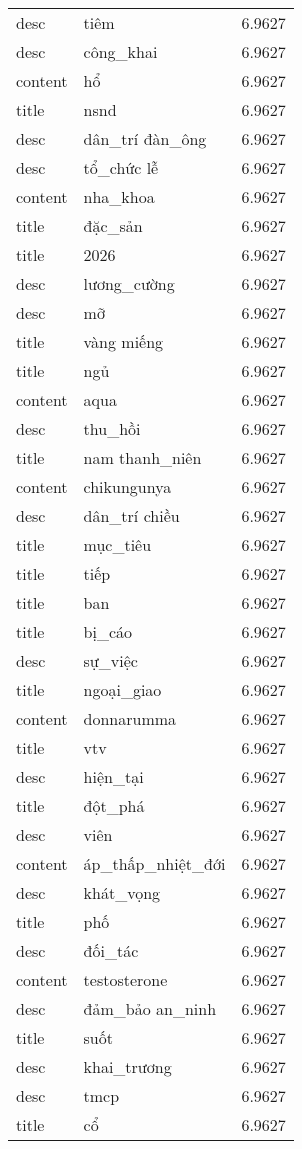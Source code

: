 \documentclass{article}
\begin{document}
\begin{tabular}{lll}
desc & tiêm & 6.9627\\
desc & công\_khai & 6.9627\\
content & hổ & 6.9627\\
title & nsnd & 6.9627\\
desc & dân\_trí đàn\_ông & 6.9627\\
desc & tổ\_chức lễ & 6.9627\\
content & nha\_khoa & 6.9627\\
title & đặc\_sản & 6.9627\\
title & 2026 & 6.9627\\
desc & lương\_cường & 6.9627\\
desc & mỡ & 6.9627\\
title & vàng miếng & 6.9627\\
title & ngủ & 6.9627\\
content & aqua & 6.9627\\
desc & thu\_hồi & 6.9627\\
title & nam thanh\_niên & 6.9627\\
content & chikungunya & 6.9627\\
desc & dân\_trí chiều & 6.9627\\
title & mục\_tiêu & 6.9627\\
title & tiếp & 6.9627\\
title & ban & 6.9627\\
title & bị\_cáo & 6.9627\\
desc & sự\_việc & 6.9627\\
title & ngoại\_giao & 6.9627\\
content & donnarumma & 6.9627\\
title & vtv & 6.9627\\
desc & hiện\_tại & 6.9627\\
title & đột\_phá & 6.9627\\
desc & viên & 6.9627\\
content & áp\_thấp\_nhiệt\_đới & 6.9627\\
desc & khát\_vọng & 6.9627\\
title & phố & 6.9627\\
desc & đối\_tác & 6.9627\\
content & testosterone & 6.9627\\
desc & đảm\_bảo an\_ninh & 6.9627\\
title & suốt & 6.9627\\
desc & khai\_trương & 6.9627\\
desc & tmcp & 6.9627\\
title & cổ & 6.9627\\

\end{tabular}
\end{document}
